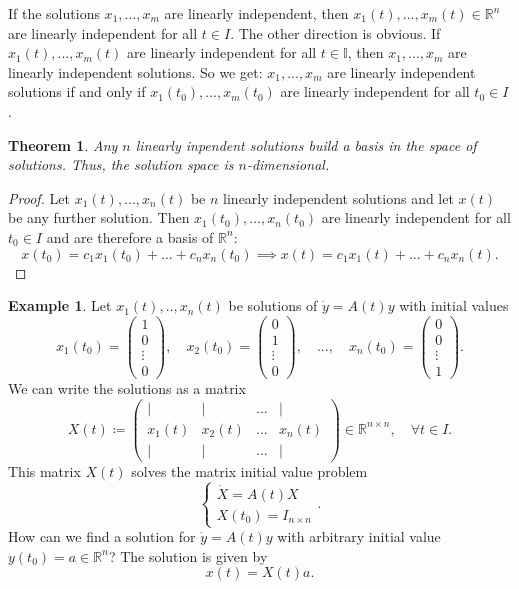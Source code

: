 \documentclass[hidelinks,a4paper, 11pt]{article}
\theoremstyle{plain}
\newtheorem{theorem}{Theorem}
\theoremstyle{break}
\theoremstyle{plain}
\theoremstyle{definition}
\newtheorem*{example}{Example}
\begin{document}
If the solutions $x_1,...,x_m$ are linearly independent, then $x_1(t),...,x_m(t) \in \mathbb R^n$ are linearly independent for all $t \in I$. 	The other direction is obvious. If $x_1(t),...,x_m(t)$ are linearly independent for all $t \in \mathbb I$, then $x_1,...,x_m$ are linearly independent solutions. So we get: 	$x_1,...,x_m$ are linearly independent solutions if and only if $x_1(t_0),...,x_m(t_0)$ are linearly independent for all $t_0 \in I$.

\begin{theorem}
	Any $n$ linearly inpendent solutions build a basis in the space of solutions. Thus, the solution space is $n$-dimensional. 
\end{theorem}

\begin{proof}
	Let $x_1(t),...,x_n(t)$ be $n$ linearly independent solutions and let $x(t)$ be any further solution. Then $x_1(t_0),...,x_n(t_0)$ are linearly independent for all $t_0 \in I$ and are therefore a basis of $\mathbb R^n$:
	\[
		x(t_0) = c_1x_1(t_0) + ... + c_nx_n(t_0) \implies x(t) = c_1x_1(t) + ... + c_nx_n(t).
	\]
\end{proof}

\begin{example}
	Let $x_1(t),..,x_n(t)$ be solutions of $\dot y = A(t)y$ with initial values 
	\[
		x_1(t_0) = \begin{pmatrix}
		 1 \\ 0 \\ \vdots \\ 0
		\end{pmatrix}, \quad x_2(t_0) =\begin{pmatrix}
		0 \\ 1 \\ \vdots \\ 0
		\end{pmatrix}, \quad ..., \quad x_n(t_0) = \begin{pmatrix}
		0 \\ 0 \\ \vdots \\ 1
		\end{pmatrix}.
	\]
	We can write the solutions as a matrix
	\[
		X(t) \coloneqq \begin{pmatrix}
		| & | & ... & | \\
		x_1(t) & x_2(t) & ... & x_n(t) \\
		| & | & ... & |
		\end{pmatrix} \in \mathbb R^{n \times n}, \quad \forall t \in I.
	\]
	This matrix $X(t)$ solves the matrix initial value problem
	\[
		\begin{cases}
			\dot X = A(t) X \\
			X(t_0) = I_{n \times n}
		\end{cases}.
	\]
	How can we find a solution for $\dot y = A(t) y$ with arbitrary initial value $y(t_0) = a \in \mathbb R^n$? The solution is given by
	\[
		x(t) = X(t)a.
	\]
\end{example}
\end{document}
